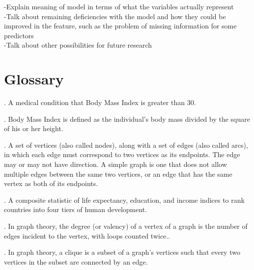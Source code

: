 \documentclass[oneside,12pt]{report}
\begin{document}
-Explain meaning of model in terms of what the variables actually represent
\\
-Talk about remaining deficiencies with the model and how they could be improved in the feature, such as the problem of missing information for some predictors
\\
-Talk about other possibilities for future research


\appendix
{}


\chapter{Glossary}\label{Glossary}

\vspace{12pt}

\vspace{8pt}
. A medical condition that Body Mass Index is greater than 30.

\vspace{8pt}
. Body Mass Index is defined as the individual's body mass divided by the square of his or her height.

\vspace{8pt}
. A set of vertices (also called nodes), along with a set of edges (also called arcs), in which each edge must correspond to two vertices as its endpoints. The edge may or may not have direction. A simple graph is one that does not allow multiple edges between the same two vertices, or an edge that has the same vertex as both of its endpoints.

\vspace{8pt}
. A composite statistic of life expectancy, education, and income indices to rank countries into four tiers of human development.

\vspace{8pt} . In graph theory, the degree (or valency) of a vertex of a graph is the number of edges incident to the vertex, with loops counted twice..

\vspace{8pt} . In graph theory, a clique is a subset of a graph's vertices such that every two vertices in the subset are connected by an edge.
\end{document}

